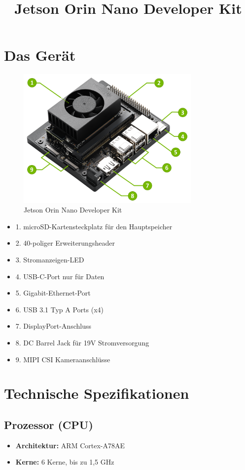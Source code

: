 \documentclass{article}
\title{Jetson Orin Nano Developer Kit}
\author{}
\date{}
\begin{document}
\maketitle
\section{Das Gerät}

\begin{figure}[h!]
    \centering

    \includegraphics[width=0.8\textwidth]{jetsonOrinNano8GB.png} 

    \caption{Jetson Orin Nano Developer Kit}
\end{figure}
\begin{itemize}
    \item 1. microSD-Kartensteckplatz für den Hauptspeicher
    \item 2. 40-poliger Erweiterungsheader
    \item 3. Stromanzeigen-LED
    \item 4. USB-C-Port nur für Daten
    \item 5. Gigabit-Ethernet-Port
    \item 6. USB 3.1 Typ A Ports (x4)
    \item 7. DisplayPort-Anschluss
    \item 8. DC Barrel Jack für 19V Stromversorgung
    \item 9. MIPI CSI Kameraanschlüsse
\end{itemize}
\clearpage
\section{Technische Spezifikationen}
\subsection{Prozessor (CPU)}
\begin{itemize}
    \item \textbf{Architektur:} ARM Cortex-A78AE
    \item \textbf{Kerne:} 6 Kerne, bis zu 1,5 GHz
\end{itemize}
\end{document}
